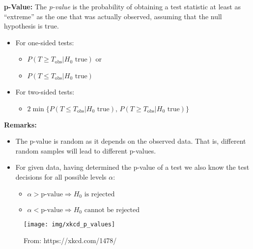 \documentclass[
]{book}
\providecommand{\tightlist}{%
  \setlength{\itemsep}{0pt}\setlength{\parskip}{0pt}}
\begin{document}
\textbf{p-Value:} The \emph{p-value} is the probability of obtaining a test statistic at least as ``extreme'' as the one that was actually observed, assuming that the null hypothesis is true.

\begin{itemize}
\tightlist
\item
  For one-sided tests:

  \begin{itemize}
  \tightlist
  \item
    \(P(T\geq T_{\text{obs}}|H_0\text{ true})\) or
  \item
    \(P(T\leq T_{\text{obs}}|H_0\text{ true})\)
  \end{itemize}
\item
  For two-sided tests:

  \begin{itemize}
  \tightlist
  \item
    \(2\min\{P(T\leq T_{\text{obs}}|H_0\text{ true}),\,P(T\geq T_{\text{obs}}|H_0\text{ true})\}\)
  \end{itemize}
\end{itemize}

\textbf{Remarks:}

\begin{itemize}
\item
  The p-value is random as it depends on the observed data. That is, different random samples will lead to different p-values.
\item
  For given data, having determined the p-value of a test we also know the test decisions for all possible levels \(\alpha\):

  \begin{itemize}
  \tightlist
  \item
    \(\alpha > \text{p-value} \Rightarrow H_0 \text{ is rejected}\)
  \item
    \(\alpha < \text{p-value} \Rightarrow H_0 \text{ cannot be rejected}\)
  \end{itemize}
\end{itemize}

\hfill\break

\begin{figure}

{\centering \texttt{[image: img/xkcd\_p\_values]} 

}

\caption{From: https://xkcd.com/1478/}\label{fig:pvalueFig}
\end{figure}
\end{document}

